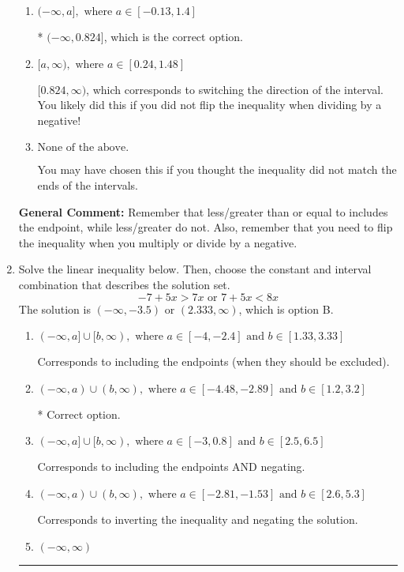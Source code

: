 \documentclass{extbook}[14pt]
\newcommand{\litem}[1]{\item #1

\rule{\textwidth}{0.4pt}}
\begin{document}
\begin{enumerate}
{\begin{enumerate}[label=\Alph*.]
 $[-0.824, \infty)$, which corresponds to switching the direction of the interval AND negating the endpoint. You likely did this if you did not flip the inequality when dividing by a negative as well as not moving values over to a side properly.
\item \( (-\infty, a], \text{ where } a \in [-0.13, 1.4] \)

* $(-\infty, 0.824]$, which is the correct option.
\item \( [a, \infty), \text{ where } a \in [0.24, 1.48] \)

 $[0.824, \infty)$, which corresponds to switching the direction of the interval. You likely did this if you did not flip the inequality when dividing by a negative!
\item \( \text{None of the above}. \)

You may have chosen this if you thought the inequality did not match the ends of the intervals.
\end{enumerate}

\textbf{General Comment:} Remember that less/greater than or equal to includes the endpoint, while less/greater do not. Also, remember that you need to flip the inequality when you multiply or divide by a negative.
}
\litem{
Solve the linear inequality below. Then, choose the constant and interval combination that describes the solution set.
\[ -7 + 5 x > 7 x \text{ or } 7 + 5 x < 8 x \]
The solution is \( (-\infty, -3.5) \text{ or } (2.333, \infty) \), which is option B.\begin{enumerate}[label=\Alph*.]
\item \( (-\infty, a] \cup [b, \infty), \text{ where } a \in [-4, -2.4] \text{ and } b \in [1.33, 3.33] \)

Corresponds to including the endpoints (when they should be excluded).
\item \( (-\infty, a) \cup (b, \infty), \text{ where } a \in [-4.48, -2.89] \text{ and } b \in [1.2, 3.2] \)

 * Correct option.
\item \( (-\infty, a] \cup [b, \infty), \text{ where } a \in [-3, 0.8] \text{ and } b \in [2.5, 6.5] \)

Corresponds to including the endpoints AND negating.
\item \( (-\infty, a) \cup (b, \infty), \text{ where } a \in [-2.81, -1.53] \text{ and } b \in [2.6, 5.3] \)

Corresponds to inverting the inequality and negating the solution.
\item \( (-\infty, \infty) \)


\end{enumerate}}
\end{enumerate}
\end{document}
